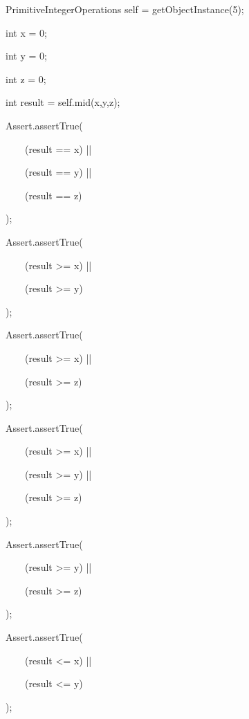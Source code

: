 \documentclass{article}
\newenvironment{tmindent}{\begin{tmparmod}{1.5em}{0pt}{0pt} }{\end{tmparmod}}
\newenvironment{tmparmod}[3]{\begin{list}{}{\setlength{\topsep}{0pt}\setlength{\leftmargin}{#1}\setlength{\rightmargin}{#2}\setlength{\parindent}{#3}\setlength{\listparindent}{\parindent}\setlength{\itemindent}{\parindent}\setlength{\parsep}{\parskip}} \item[]}{\end{list}}
\newenvironment{tmparsep}[1]{\begingroup\setlength{\parskip}{#1}}{\endgroup}
\begin{document}
\begin{example}
\begin{tmindent}
\begin{tmparsep}{0em}
      \ \ \ \ \ \ \ PrimitiveIntegerOperations self = getObjectInstance(5);
      
      \ \ \ \ \ \ \ int x = 0;
      
      \ \ \ \ \ \ \ int y = 0;
      
      \ \ \ \ \ \ \ int z = 0;
      
      \ \ \ \ \ \ \ int result = self.mid(x,y,z);
      
      \ \ \ \ \ \ \ Assert.assertTrue(
      
      \ \ \ \ \ \ \ \ \ \ \ (result == x) ||
      
      \ \ \ \ \ \ \ \ \ \ \ (result == y) ||
      
      \ \ \ \ \ \ \ \ \ \ \ (result == z)
      
      \ \ \ \ \ \ \ );
      
      \ \ \ \ \ \ \ Assert.assertTrue(
      
      \ \ \ \ \ \ \ \ \ \ \ (result >= x) ||
      
      \ \ \ \ \ \ \ \ \ \ \ (result >= y)
      
      \ \ \ \ \ \ \ );
      
      \ \ \ \ \ \ \ Assert.assertTrue(
      
      \ \ \ \ \ \ \ \ \ \ \ (result >= x) ||
      
      \ \ \ \ \ \ \ \ \ \ \ (result >= z)
      
      \ \ \ \ \ \ \ );
      
      \ \ \ \ \ \ \ Assert.assertTrue(
      
      \ \ \ \ \ \ \ \ \ \ \ (result >= x) ||
      
      \ \ \ \ \ \ \ \ \ \ \ (result >= y) ||
      
      \ \ \ \ \ \ \ \ \ \ \ (result >= z)
      
      \ \ \ \ \ \ \ );
      
      \ \ \ \ \ \ \ Assert.assertTrue(
      
      \ \ \ \ \ \ \ \ \ \ \ (result >= y) ||
      
      \ \ \ \ \ \ \ \ \ \ \ (result >= z)
      
      \ \ \ \ \ \ \ );
      
      \ \ \ \ \ \ \ Assert.assertTrue(
      
      \ \ \ \ \ \ \ \ \ \ \ (result <= x) ||
      
      \ \ \ \ \ \ \ \ \ \ \ (result <= y)
      
      \ \ \ \ \ \ \ );
      

\end{tmparsep}
\end{tmindent}
\end{example}
\end{document}
